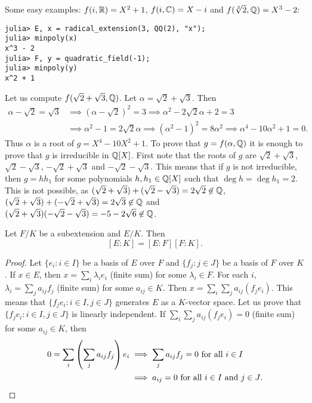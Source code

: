 Some easy examples: $f(i,\mathbb{R})=X^2+1$, 
$f(i,\mathbb{C})=X-i$ and 
$f(\sqrt[3]{2},\mathbb{Q})=X^3-2$:
\begin{lstlisting}
julia> E, x = radical_extension(3, QQ(2), "x");
julia> minpoly(x)
x^3 - 2
julia> F, y = quadratic_field(-1);
julia> minpoly(y)
x^2 + 1
\end{lstlisting}

\begin{example}
	Let us compute 
	$f(\sqrt{2}+\sqrt{3},\mathbb{Q})$. Let $\alpha=\sqrt{2}+\sqrt{3}$. 
	Then 
	\begin{align*}
		\alpha-\sqrt{2}=\sqrt{3} & \implies 
		(\alpha-\sqrt{2})^2=3 \implies \alpha^2-2\sqrt{2}\alpha+2=3\\
		&\implies \alpha^2-1=2\sqrt{2}\alpha \implies
		(\alpha^2-1)^2=8\alpha^2\implies
		\alpha^4-10\alpha^2+1=0.
	\end{align*}
	Thus $\alpha$ is a root of $g=X^4-10X^2+1$. To prove that $g=f(\alpha,\mathbb{Q})$ 
	it is enough to prove that 
	$g$ is irreducible in $\mathbb{Q}[X]$. First note that 
	the roots
	of $g$ are $\sqrt{2}+\sqrt{3}$, $\sqrt{2}-\sqrt{3}$, 
	$-\sqrt{2}+\sqrt{3}$ and $-\sqrt{2}-\sqrt{3}$. This means that
	if $g$ is not irreducible, 
	then $g=hh_1$ for some polynomials $h,h_1\in\mathbb{Q}[X]$ such that
	$\deg h=\deg h_1=2$. This is not possible, as 
	$(\sqrt{2}+\sqrt{3})+(\sqrt{2}-\sqrt{3})=2\sqrt{2}\not\in\mathbb{Q}$, 
	$(\sqrt{2}+\sqrt{3})+(-\sqrt{2}+\sqrt{3})=2\sqrt{3}\not\in\mathbb{Q}$ and 
	$(\sqrt{2}+\sqrt{3})(-\sqrt{2}-\sqrt{3})=-5-2\sqrt{6}\not\in\mathbb{Q}$.
\end{example}


\begin{proposition}
	Let $F/K$ be a subextension and $E/K$. Then
	\[
	[E:K]=[E:F][F:K].
	\]
\end{proposition}

\begin{proof}
	Let $\{e_i:i\in I\}$ be a basis of $E$ over $F$
	and $\{f_j:j\in J\}$ be a basis of $F$ over $K$. If $x\in E$,
	then $x=\sum_i \lambda_ie_i$ (finite sum) 
	for some $\lambda_i\in F$. For each $i$, 
	$\lambda_i=\sum_j a_{ij}f_j$ (finite sum)
	for some $a_{ij}\in K$. Then 
	$x=\sum_i\sum_j a_{ij}(f_je_i)$. This means
	that $\{f_je_i:i\in I,j\in J\}$ generates
	$E$ as a $K$-vector space. Let us prove that 
	$\{f_je_i:i\in I,j\in J\}$
	is linearly independent. If $\sum_i\sum_j a_{ij}(f_je_i)=0$ (finite sum)
	for some $a_{ij}\in K$, 
	then
	\begin{align*}
		0=\sum_i\left(\sum_j a_{ij}f_j\right)e_i&\implies
		\sum_j a_{ij}f_j=0\text{ for all $i\in I$}\\
		&\implies 
		a_{ij}=0\text{ for all $i\in I$ and $j\in J$}.\qedhere
	\end{align*}
\end{proof}


